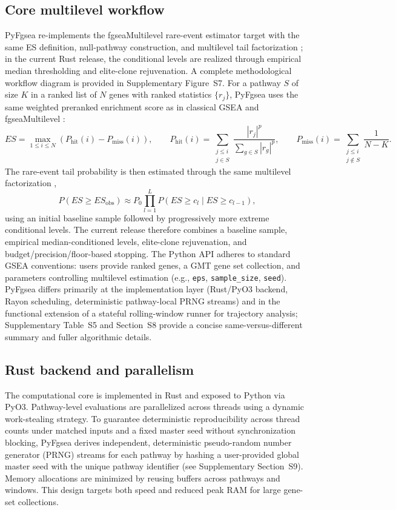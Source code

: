\documentclass[numsec,webpdf,modern,large,numbered]{oup-authoring-template}
\newcommand{\rev}[1]{\textcolor{revisionred}{#1}}
\begin{document}
\subsection{Core multilevel workflow}
\rev{PyFgsea re-implements the fgseaMultilevel rare-event estimator target with the same ES definition, null-pathway construction, and multilevel tail factorization \citep{Korotkevich2021FGSEA}; in the current Rust release, the conditional levels are realized through empirical median thresholding and elite-clone rejuvenation. A complete methodological workflow diagram is provided in Supplementary Figure~S7.}
{\color{revisionred}
For a pathway $S$ of size $K$ in a ranked list of $N$ genes with ranked statistics $\{r_j\}$, PyFgsea uses the same weighted preranked enrichment score as in classical GSEA and fgseaMultilevel \citep{Subramanian2005GSEA,Korotkevich2021FGSEA}:
\[
ES=\max_{1\le i\le N}\left(P_{\mathrm{hit}}(i)-P_{\mathrm{miss}}(i)\right),\qquad
P_{\mathrm{hit}}(i)=\sum_{\substack{j\le i\\ j\in S}}\frac{|r_j|^{p}}{\sum_{g\in S}|r_g|^{p}},\qquad
P_{\mathrm{miss}}(i)=\sum_{\substack{j\le i\\ j\notin S}}\frac{1}{N-K}.
\]
The rare-event tail probability is then estimated through the same multilevel factorization \citep{Korotkevich2021FGSEA},
\[
P(ES\ge ES_{\mathrm{obs}})\approx P_0\prod_{l=1}^{L}P(ES\ge c_l\mid ES\ge c_{l-1}),
\]
using an initial baseline sample followed by progressively more extreme conditional levels. The current release therefore combines a baseline sample, empirical median-conditioned levels, elite-clone rejuvenation, and budget/precision/floor-based stopping.}
The Python API adheres to standard GSEA conventions: users provide ranked genes, a GMT gene set collection, and parameters controlling multilevel estimation (e.g., \texttt{eps}, \texttt{sample\_size}, \texttt{seed}).
\rev{PyFgsea differs primarily at the implementation layer (Rust/PyO3 backend, Rayon scheduling, deterministic pathway-local PRNG streams) and in the functional extension of a stateful rolling-window runner for trajectory analysis; Supplementary Table~S5 and Section~S8 provide a concise same-versus-different summary and fuller algorithmic details.}

\subsection{Rust backend and parallelism}
The computational core is implemented in Rust and exposed to Python via PyO3.
\rev{Pathway-level evaluations are parallelized across threads using a dynamic work-stealing strategy. To guarantee deterministic reproducibility across thread counts under matched inputs and a fixed master seed without synchronization blocking, PyFgsea derives independent, deterministic pseudo-random number generator (PRNG) streams for each pathway by hashing a user-provided global master seed with the unique pathway identifier (see Supplementary Section~S9).}
Memory allocations are minimized by reusing buffers across pathways and windows.
This design targets both speed and reduced peak RAM for large gene-set collections.
\end{document}
